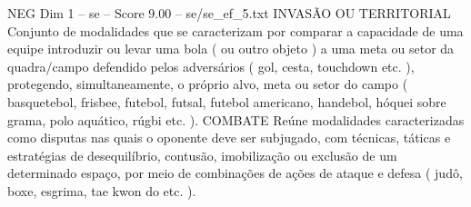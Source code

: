 \begin{textsample}{NEG Dim 1 – se – Score 9.00 – se/se\_ef\_5.txt}
INVASÃO OU TERRITORIAL Conjunto de modalidades que se caracterizam por comparar a capacidade de uma equipe introduzir ou levar uma bola ( ou outro objeto ) a uma meta ou setor da quadra/campo defendido pelos adversários ( gol, cesta, touchdown etc. ), protegendo, simultaneamente, o próprio alvo, meta ou setor do campo ( basquetebol, frisbee, futebol, futsal, futebol americano, handebol, hóquei sobre grama, polo aquático, rúgbi etc. ).
COMBATE Reúne modalidades caracterizadas como disputas nas quais o oponente deve ser subjugado, com técnicas, táticas e estratégias de desequilíbrio, contusão, imobilização ou exclusão de um determinado espaço, por meio de combinações de ações de ataque e defesa ( judô, boxe, esgrima, tae kwon do etc. ).

\end{textsample}
